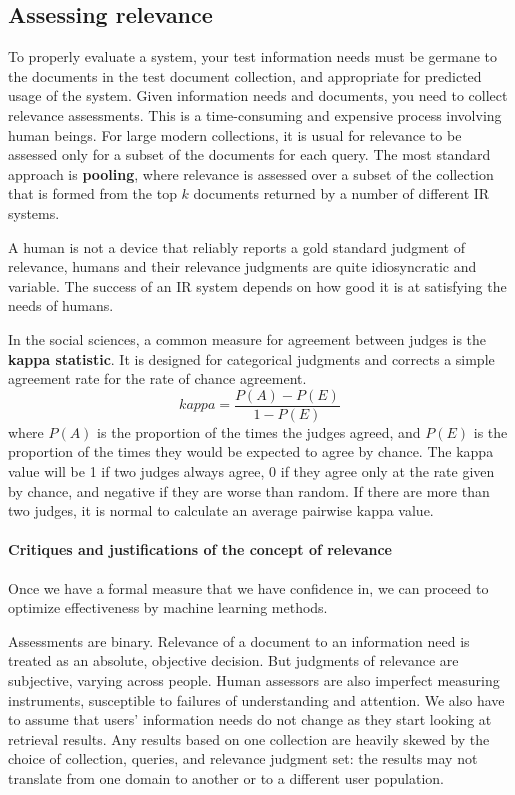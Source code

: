 \documentclass[letterpaper,11pt]{article}
\begin{document}
\subsection{Assessing relevance}
To properly evaluate a system, your test information needs must be germane to the documents in the test document collection, and appropriate for predicted usage of the system. Given information needs and documents, you need to collect relevance assessments. This is a time-consuming and expensive process involving human beings. For large modern collections, it is usual for relevance to be assessed only for a subset of the documents for each query. The most standard approach is \textbf{pooling}, where relevance is assessed over a subset of the collection that is formed from the top $k$ documents returned by a number of different IR systems.

A human is not a device that reliably reports a gold standard judgment of relevance, humans and their relevance judgments are quite idiosyncratic and variable. The success of an IR system depends on how good it is at satisfying the needs of humans.

In the social sciences, a common measure for agreement between judges is the \textbf{kappa statistic}. It is designed for categorical judgments and corrects a simple agreement rate for the rate of chance agreement.
\[
kappa = \frac{P(A) - P(E)}{1 - P(E)}
\]
where $P(A)$ is the proportion of the times the judges agreed, and $P(E)$ is the proportion of the times they would be expected to agree by chance. The kappa value will be 1 if two judges always agree, 0 if they agree only at the rate given by chance, and negative if they are worse than random. If there are more than two judges, it is normal to calculate an average pairwise kappa value.

\paragraph{Critiques and justifications of the concept of relevance}
Once we have a formal measure that we have confidence in, we can proceed to optimize effectiveness by machine learning methods.

Assessments are binary. Relevance of a document to an information need is treated as an absolute, objective decision. But judgments of relevance are subjective, varying across people. Human assessors are also imperfect measuring instruments, susceptible to failures of understanding and attention. We also have to assume that users’ information needs do not change as they start looking at retrieval results. Any results based on one collection are heavily skewed by the choice of collection, queries, and relevance judgment set: the results may not translate from one domain to another or to a different user population.
\end{document}

